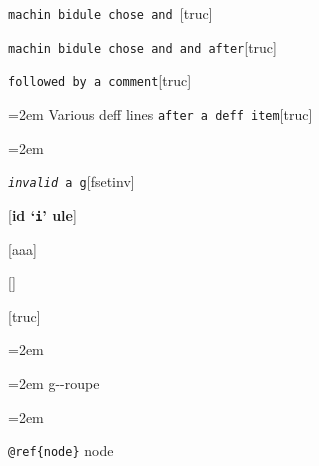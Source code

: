 \documentclass{book}
\begin{document}
%
\noindent\texttt\bgroup{}machin bidule chose and \egroup{}\hfill[truc]



%
\noindent\texttt\bgroup{}machin bidule chose and and after\egroup{}\hfill[truc]



%
\noindent\texttt\bgroup{}followed by a comment\egroup{}\hfill[truc]



%
\par\begingroup\obeylines\obeyspaces\frenchspacing\leftskip=2em\relax\parskip=0pt\relax\ttfamily{}%
Various deff lines
\endgroup{}%
\noindent\texttt\bgroup{}after a deff item\egroup{}\hfill[truc]



%
\par\begingroup\obeylines\obeyspaces\frenchspacing\leftskip=2em\relax\parskip=0pt\relax\ttfamily{}%

\endgroup{}%
\noindent\texttt\bgroup{}\emph{invalid} a g\egroup{}\hfill[fsetinv]



%
\noindent\texttt\bgroup{}\egroup{}\hfill[\textbf{id `\texttt{i}' ule}]




\noindent\texttt\bgroup{}\egroup{}\hfill[aaa]



\noindent\texttt\bgroup{}\egroup{}\hfill[]



\noindent\texttt\bgroup{}\egroup{}\hfill[truc]



\par\begingroup\obeylines\obeyspaces\frenchspacing\leftskip=2em\relax\parskip=0pt\relax\ttfamily{}%

\endgroup{}%
\par\begingroup\obeylines\obeyspaces\frenchspacing\leftskip=2em\relax\parskip=0pt\relax\ttfamily{}%
g{-}{-}roupe
\endgroup{}%
\par\begingroup\obeylines\obeyspaces\frenchspacing\leftskip=2em\relax\parskip=0pt\relax\ttfamily{}%

\texttt{@ref\{node\}} node
\end{document}
